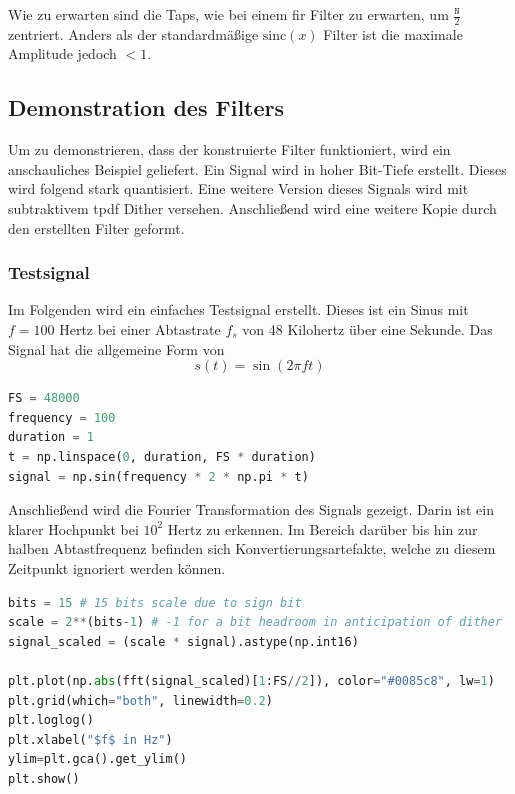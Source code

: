 Wie zu erwarten sind die Taps, wie bei einem \gls{fir} Filter zu
erwarten, um \(\frac{\texttt{N}}{2}\) zentriert. Anders als der
standardmäßige \(\text{sinc} (x)\) Filter ist die maximale Amplitude
jedoch \(<1\).

\hypertarget{demonstration-des-filters}{%
\subsection{Demonstration des Filters}\label{demonstration-des-filters}}

Um zu demonstrieren, dass der konstruierte Filter funktioniert, wird ein
anschauliches Beispiel geliefert. Ein Signal wird in hoher Bit-Tiefe
erstellt. Dieses wird folgend stark quantisiert. Eine weitere Version
dieses Signals wird mit subtraktivem \gls{tpdf} Dither versehen.
Anschließend wird eine weitere Kopie durch den erstellten Filter
geformt.

\hypertarget{testsignal}{%
\subsubsection{Testsignal}\label{testsignal}}

Im Folgenden wird ein einfaches Testsignal erstellt. Dieses ist ein
Sinus mit \(f=100\) Hertz bei einer Abtastrate \(f_s\) von 48 Kilohertz
über eine Sekunde. Das Signal hat die allgemeine Form von
\[s(t) = \sin (2 \pi f t)\]

\begin{lstlisting}[language=Python]
FS = 48000
frequency = 100
duration = 1
t = np.linspace(0, duration, FS * duration)
signal = np.sin(frequency * 2 * np.pi * t)
\end{lstlisting}

Anschließend wird die Fourier Transformation des Signals gezeigt. Darin
ist ein klarer Hochpunkt bei \(10^2\) Hertz zu erkennen. Im Bereich
darüber bis hin zur halben Abtastfrequenz befinden sich
Konvertierungsartefakte, welche zu diesem Zeitpunkt ignoriert werden
können.

\begin{lstlisting}[language=Python]
bits = 15 # 15 bits scale due to sign bit
scale = 2**(bits-1) # -1 for a bit headroom in anticipation of dither
signal_scaled = (scale * signal).astype(np.int16)

plt.plot(np.abs(fft(signal_scaled)[1:FS//2]), color="#0085c8", lw=1)
plt.grid(which="both", linewidth=0.2)
plt.loglog()
plt.xlabel("$f$ in Hz")
ylim=plt.gca().get_ylim()
plt.show()
\end{lstlisting}


